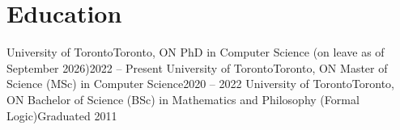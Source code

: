 \documentclass[9pt, letterpaper]{extarticle}
\begin{document}
\section{Education}
\begin{itemize}[leftmargin=0.15in]
  \resumeSubheading
    {University of Toronto}{Toronto, ON}
    {PhD in Computer Science (on leave as of September 2026)}{2022 -- Present}
  \resumeSubheading
    {University of Toronto}{Toronto, ON}
    {Master of Science (MSc) in Computer Science}{2020 -- 2022}
  \resumeSubheading
    {University of Toronto}{Toronto, ON}
    {Bachelor of Science (BSc) in Mathematics and Philosophy (Formal Logic)}{Graduated 2011}
\end{itemize}
\end{document}
